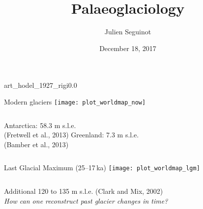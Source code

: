 

\title{Palaeoglaciology}
\author{Julien Seguinot}
\date{December 18, 2017}

\usepackage{multicol}






    \begin{backgroundframe}[b]{art_hodel_1927_rigi}{0.0}{}
    \end{backgroundframe}

    \centering  %


    \begin{frame}{Modern glaciers}
      \texttt{[image: plot\_worldmap\_now]}\\
      \pause\bigskip
      \begin{columns}
        \column{60mm}
          \centering
          Antarctica: 58.3 m s.l.e.\\
          (Fretwell et al., 2013)
        \column{60mm}
          \centering
          Greenland: 7.3 m s.l.e.\\
          (Bamber et al., 2013)
      \end{columns}
    \end{frame}

    \begin{frame}{Last Glacial Maximum (25--17\,ka)}
      \texttt{[image: plot\_worldmap\_lgm]}\\
      \bigskip
      \begin{columns}  %
        \column{120mm}
          \centering
          Additional 120 to 135 m s.l.e. (Clark and Mix, 2002)\pause\\
          \emph{How can one reconstruct past glacier changes in time?}
      \end{columns}
    \end{frame}


